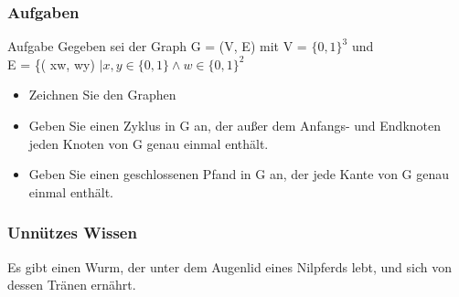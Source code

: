 \documentclass{beamer}
\begin{document}
\begin{frame}
	\frametitle{Aufgaben}
	\begin{block} {Aufgabe}
		Gegeben sei der Graph G = (V, E) mit V = $\{0, 1\}^3$ und \\
		E = \{( xw, wy) $\mid x, y \in \{0, 1\} \land w \in \{0, 1\}^2$
		\begin{itemize}
			\item Zeichnen Sie den Graphen
			\item Geben Sie einen Zyklus in G an, der au{\ss}er dem Anfangs- und Endknoten jeden Knoten von G genau 					einmal enth\"alt.
			\item Geben Sie einen geschlossenen Pfand in G an, der jede Kante von G genau einmal enth\"alt.
		\end{itemize}
	\end{block}
\end{frame}

\begin{frame}
	\frametitle{Unnützes Wissen}
	\begin{center}
		Es gibt einen Wurm, der unter dem Augenlid eines Nilpferds lebt, und sich von dessen Tränen ernährt.
	\end{center}
\end{frame}
\end{document}
